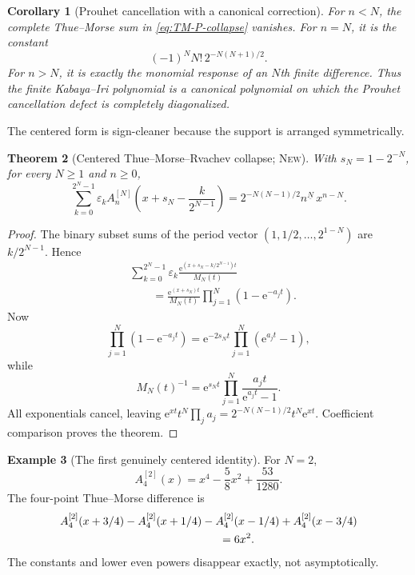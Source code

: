 \documentclass[11pt,oneside]{article}
\theoremstyle{frontier}
\newtheorem{theorem}{Theorem}[section]
\newtheorem{corollary}[theorem]{Corollary}
\theoremstyle{definition}
\newtheorem{example}[theorem]{Example}
\theoremstyle{remark}
\newcommand{\e}{\mathrm e}
\newcommand{\eps}{\varepsilon}
\newcommand{\fall}[2]{#1^{\underline{#2}}}
\newcommand{\statusnew}{\textsc{New}}
\begin{document}
\begin{corollary}[Prouhet cancellation with a canonical correction]
\label{cor:Prouhet-canonical}
For $n<N$, the complete Thue--Morse sum in \eqref{eq:TM-P-collapse} vanishes.  For $n=N$, it is the
constant
\begin{equation}
 (-1)^NN!\,2^{-N(N+1)/2}.
 \label{eq:TM-first-nonzero}
\end{equation}
For $n>N$, it is exactly the monomial response of an $N$th finite difference.  Thus the finite
Kabaya--Iri polynomial is a canonical polynomial on which the Prouhet cancellation defect is
completely diagonalized.
\end{corollary}

The centered form is sign-cleaner because the support is arranged symmetrically.

\begin{theorem}[Centered Thue--Morse--Rvachev collapse; \statusnew]
\label{thm:TM-centered}
With $s_N=1-2^{-N}$, for every $N\ge1$ and $n\ge0$,
\begin{equation}
 \boxed{
 \sum_{k=0}^{2^N-1}\eps_k
 A_n^{[N]}\!\left(x+s_N-\frac{k}{2^{N-1}}\right)
 =2^{-N(N-1)/2}\fall nN\,x^{n-N}.
 }
 \label{eq:TM-A-collapse}
\end{equation}
\end{theorem}

\begin{proof}
The binary subset sums of the period vector
$(1,1/2,\ldots,2^{1-N})$ are $k/2^{N-1}$.  Hence
\begin{align*}
 &\sum_{k=0}^{2^N-1}\eps_k
 \frac{\e^{(x+s_N-k/2^{N-1})t}}{M_N(t)}\\
 &\qquad=
 \frac{\e^{(x+s_N)t}}{M_N(t)}
 \prod_{j=1}^{N}(1-\e^{-a_jt}).
\end{align*}
Now
\[
 \prod_{j=1}^{N}(1-\e^{-a_jt})
 =\e^{-2s_Nt}\prod_{j=1}^{N}(\e^{a_jt}-1),
\]
while
\[
 M_N(t)^{-1}=\e^{s_Nt}\prod_{j=1}^{N}\frac{a_jt}{\e^{a_jt}-1}.
\]
All exponentials cancel, leaving
$\e^{xt}t^N\prod_ja_j=2^{-N(N-1)/2}t^N\e^{xt}$.  Coefficient comparison proves the theorem.
\end{proof}

\begin{example}[The first genuinely centered identity]
For $N=2$,
\begin{equation}
 A_4^{[2]}(x)=x^4-\frac58x^2+\frac{53}{1280}.
 \label{eq:A4N2}
\end{equation}
The four-point Thue--Morse difference is
\begin{align}
 &A_4^{[2]}(x+3/4)-A_4^{[2]}(x+1/4)
 -A_4^{[2]}(x-1/4)+A_4^{[2]}(x-3/4)
 \notag\\
 &\hspace{5cm}=6x^2.
 \label{eq:A4N2-example}
\end{align}
The constants and lower even powers disappear exactly, not asymptotically.
\end{example}
\end{document}

